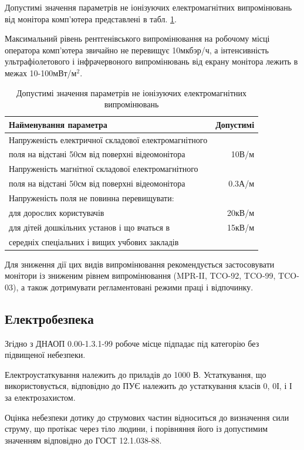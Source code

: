 Допустимі значення параметрів не іонізуючих електромагнітних випромінювань від монітора комп'ютера представлені в табл. \ref{tab:x-ray}.

Максимальний рівень рентгенівського випромінювання на робочому місці оператора комп'ютера звичайно не перевищує 10мкбэр/ч, а інтенсивність ультрафіолетового і інфрачервоного випромінювань від екрану монітора лежить в межах 10-100мВт/м$^2$.

\begin{table}[H]
	\centering
	\caption{Допустимі значення параметрів не іонізуючих електромагнітних випромінювань}
	\begin{tabular}{| l | r | }
		\hline
		Найменування параметра & Допустимі \\\hline
	    Напруженість електричної складової електромагнітного & \\
		поля на відстані 50см від поверхні відеомонітора & 10В/м \\\hline
	    Напруженість магнітної складової електромагнітного & \\
		поля на відстані 50см від поверхні відеомонітора & 0.3А/м \\\hline
		Напруженість поля не повинна перевищувати:  & \\
		для дорослих користувачів & 20кВ/м \\
		для дітей дошкільних установ і що вчаться в & 15кВ/м \\
		середніх спеціальних і вищих учбових закладів & \\\hline
	\end{tabular}
	\label{tab:x-ray}
\end{table}

Для зниження дії цих видів випромінювання рекомендується застосовувати монітори із зниженим рівнем випромінювання (MPR-II, TCO-92, TCO-99, TCO-03), а також дотримувати регламентовані режими праці і відпочинку.
\subsection{Електробезпека}
Згідно з ДНАОП 0.00-1.3.1-99 робоче місце підпадає під категорію без підвищеної небезпеки.

Електроустаткування належить до приладів до 1000 В. Устаткування, що використовується, відповідно до ПУЄ належить до устаткування класів 0, 0І, і І за електрозахистом.

Оцінка небезпеки дотику до струмових частин відноситься до визначення сили струму, що протікає через тіло людини, і порівняння його із допустимим значенням відповідно до ГОСТ 12.1.038-88.

